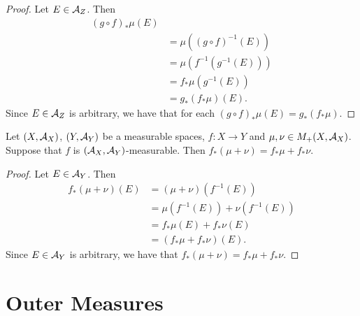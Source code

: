 \documentclass{book}
\begin{document}
\begin{proof}
	Let $E \in \mathcal{A}_Z$. Then 
	\begin{align*}
		(g \circ f)_*\mu(E) \\
		& = \mu((g \circ f)^{-1}(E)) \\
		& = \mu(f^{-1}(g^{-1}(E))) \\
		& = f_*\mu(g^{-1}(E)) \\
		& = g_*(f_*\mu)(E).
	\end{align*}
	Since $E \in \mathcal{A}_Z$ is arbitrary, we have that for each $(g \circ f)_*\mu(E) = g_*(f_*\mu)$.
\end{proof}

\begin{ex} 
	Let $(X, \mathcal{A}_X)$, $(Y, \mathcal{A}_Y)$ be a measurable spaces, $f: X \rightarrow Y$ and $\mu, \nu \in M_+(X, \mathcal{A}_X)$. Suppose that $f$ is $(\mathcal{A}_X, \mathcal{A}_Y)$-measurable. Then $f_*(\mu + \nu) = f_*\mu + f_*\nu$.
\end{ex}

\begin{proof}
	Let $E \in \mathcal{A}_Y$. Then 
	\begin{align*}
		f_*(\mu + \nu)(E)
		& = (\mu + \nu)(f^{-1}(E)) \\
		& = \mu(f^{-1}(E)) + \nu(f^{-1}(E)) \\
		& = f_*\mu(E) + f_*\nu(E) \\
		& = (f_*\mu + f_*\nu)(E).
	\end{align*}
	Since $E \in \mathcal{A}_Y$ is arbitrary, we have that $f_*(\mu + \nu) = f_*\mu + f_*\nu$.
\end{proof}




















	
	
	
	
	
	
	
	
	
	
	
	
	
	
	
	
	\newpage
	\section{Outer Measures}
	
\end{document}
